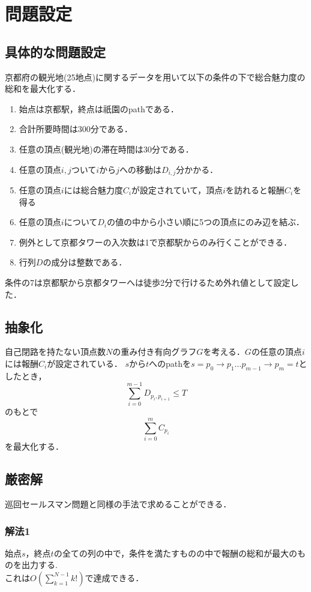\documentclass[a4paper,12pt]{jsreport}
\theoremstyle{definition}
\begin{document}
\chapter{問題設定}
\section{具体的な問題設定}
京都府の観光地(25地点)に関するデータを用いて以下の条件の下で総合魅力度の総和を最大化する．
\begin{enumerate}
    \item 始点は京都駅，終点は祇園のpathである．
    \item 合計所要時間は300分である．
    \item 任意の頂点(観光地)の滞在時間は30分である．
    \item 任意の頂点$i,j$ついて$i$から$j$への移動は$D_{i,j}$分かかる．
    \item 任意の頂点$i$には総合魅力度$C_i$が設定されていて，頂点$i$を訪れると報酬$C_i$を得る
    \item 任意の頂点$i$について$D_i$の値の中から小さい順に5つの頂点にのみ辺を結ぶ．
    \item 例外として京都タワーの入次数は1で京都駅からのみ行くことができる．
    \item 行列$D$の成分は整数である．
\end{enumerate}
条件の7は京都駅から京都タワーへは徒歩2分で行けるため外れ値として設定した．
\section{抽象化}
自己閉路を持たない頂点数$N$の重み付き有向グラフ$G$を考える．$G$の任意の頂点$i$には報酬$C_i$が設定されている．
$s$から$t$へのpathを$s=p_0\to p_1 \ldots p_{m-1}\to p_m=t$としたとき，
\begin{equation}
    \sum_{i=0}^{m-1} D_{p_i,p_{i+1}}\leq T
\end{equation}
のもとで
\begin{equation}
    \sum_{i=0}^{m} C_{p_i}
\end{equation}
を最大化する．
\section{厳密解}
巡回セールスマン問題と同様の手法で求めることができる．
\subsection{解法1}
始点$s$，終点$t$の全ての列の中で，条件を満たすものの中で報酬の総和が最大のものを出力する.\\
これは$\displaystyle O\left(\sum_{k=1}^{N-1}k!\right)$で達成できる．
\end{document}

